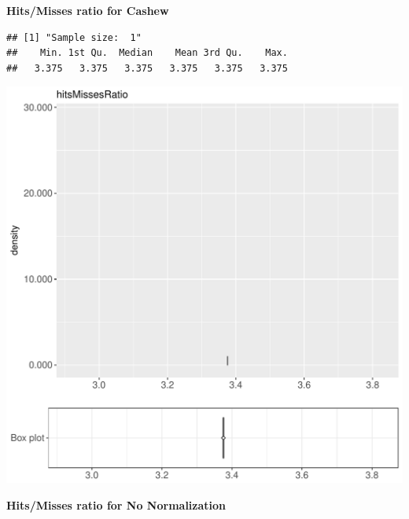 \documentclass{article}\usepackage[]{graphicx}\usepackage[]{color}
\makeatletter
\def\maxwidth{ %
  \ifdim\Gin@nat@width>\linewidth
    \linewidth
  \else
    \Gin@nat@width
  \fi
}
\newenvironment{kframe}{%
 \def\at@end@of@kframe{}%
 \ifinner\ifhmode%
  \def\at@end@of@kframe{\end{minipage}}%
  \begin{minipage}{\columnwidth}%
 \fi\fi%
 \def\FrameCommand##1{\hskip\@totalleftmargin \hskip-\fboxsep
 \colorbox{shadecolor}{##1}\hskip-\fboxsep
     \hskip-\linewidth \hskip-\@totalleftmargin \hskip\columnwidth}%
 \MakeFramed {\advance\hsize-\width
   \@totalleftmargin\z@ \linewidth\hsize
   \@setminipage}}%
 {\par\unskip\endMakeFramed%
 \at@end@of@kframe}
\newenvironment{knitrout}{}{} %
\makeatother
\begin{document}
 \textbf{Hits/Misses ratio for Cashew}
\begin{knitrout}
\color{fgcolor}\begin{kframe}
\begin{verbatim}
## [1] "Sample size:  1"
##    Min. 1st Qu.  Median    Mean 3rd Qu.    Max. 
##   3.375   3.375   3.375   3.375   3.375   3.375
\end{verbatim}


{\ttfamily\noindent\bfseries{}}\end{kframe}
\includegraphics[width=\maxwidth]{figure/RH5_cashew_password2-1} 

\end{knitrout}
 \textbf{Hits/Misses ratio for No Normalization}
\end{document}
